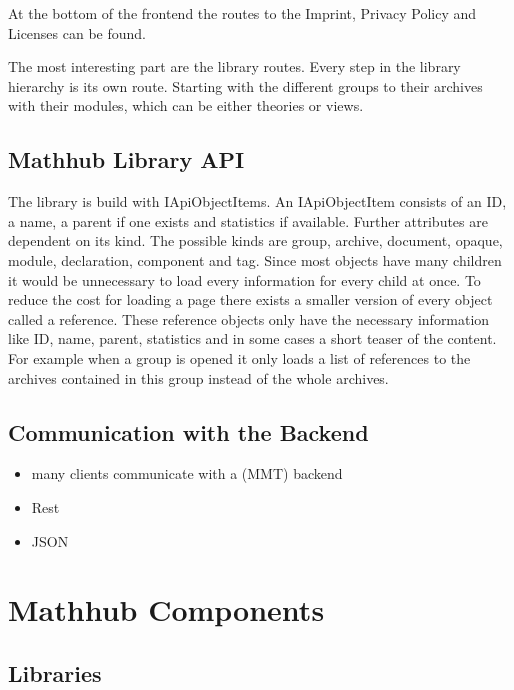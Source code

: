 \documentclass[11pt,a4paper]{article}
\begin{document}
At the bottom of the frontend the routes to the Imprint, Privacy Policy and Licenses can be found.

The most interesting part are the library routes. Every step in the library hierarchy is its own route. Starting with the different groups to their archives with their modules, which can be either theories or views.

\subsection{Mathhub Library API}
The library is build with IApiObjectItems. An IApiObjectItem consists of an ID, a name, a parent if one exists and statistics if available. Further attributes are dependent on its kind. The possible kinds are group, archive, document, opaque, module, declaration, component and tag.  Since most objects have many children it would be unnecessary to load every information for every child at once. To reduce the cost for loading a page there exists a smaller version of every object called a reference. These reference objects only have the necessary information like ID, name, parent, statistics and in some cases a short teaser of the content. For example when a group is opened it only loads a list of references to the archives contained in this group instead of the whole archives.

\subsection*{Communication with the Backend}
\begin{itemize}
\item many clients communicate with a (MMT) backend
\item Rest
\item JSON
\end{itemize}


\section{Mathhub Components}
	\subsection{Libraries}
\end{document}
